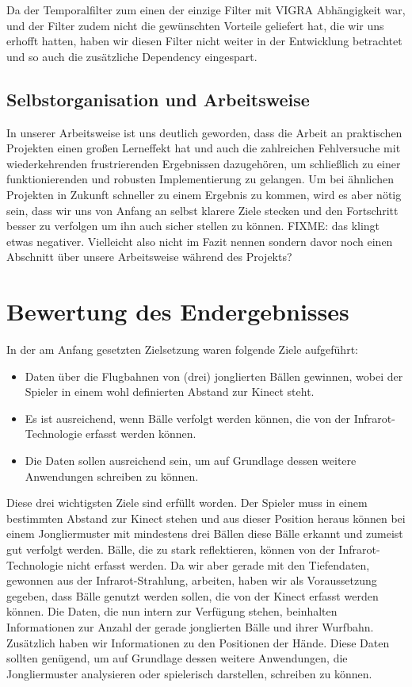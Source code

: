 \documentclass[12pt,a4paper,ngerman]{scrartcl}
\begin{document}
Da der Temporalfilter zum einen der einzige Filter mit VIGRA Abhängigkeit war, und
der Filter zudem nicht die gewünschten Vorteile geliefert hat, die wir uns erhofft
hatten, haben wir diesen Filter nicht weiter in der Entwicklung betrachtet und so
auch die zusätzliche Dependency eingespart.

\subsection{Selbstorganisation und Arbeitsweise}

In unserer Arbeitsweise ist uns deutlich geworden, dass die Arbeit an praktischen
Projekten einen großen Lerneffekt hat und auch die zahlreichen Fehlversuche mit
wiederkehrenden frustrierenden Ergebnissen dazugehören, um schließlich zu einer
funktionierenden und robusten Implementierung zu gelangen. Um bei ähnlichen
Projekten in Zukunft schneller zu einem Ergebnis zu kommen, wird es aber nötig
sein, dass wir uns von Anfang an selbst klarere Ziele stecken und den Fortschritt
besser zu verfolgen um ihn auch sicher stellen zu können.
{\color{red}FIXME: das klingt etwas negativer. Vielleicht also nicht im Fazit nennen sondern davor noch einen Abschnitt über unsere Arbeitsweise während des Projekts?}

\section{Bewertung des Endergebnisses}

In der am Anfang gesetzten Zielsetzung waren folgende Ziele aufgeführt:

\begin{itemize}
\item Daten über die Flugbahnen von (drei) jonglierten Bällen gewinnen, wobei der Spieler in einem wohl definierten Abstand zur Kinect steht.
\item Es ist ausreichend, wenn Bälle verfolgt werden können, die von der Infrarot-Technologie erfasst werden können.
\item Die Daten sollen ausreichend sein, um auf Grundlage dessen weitere Anwendungen schreiben zu können.
\end{itemize}

Diese drei wichtigsten Ziele sind erfüllt worden. Der Spieler muss in einem bestimmten Abstand zur Kinect stehen und aus dieser Position heraus können bei einem Jongliermuster mit mindestens drei Bällen diese Bälle erkannt und zumeist gut verfolgt werden. Bälle, die zu stark reflektieren, können von der Infrarot-Technologie nicht erfasst werden. Da wir aber gerade mit den Tiefendaten, gewonnen aus der Infrarot-Strahlung, arbeiten, haben wir als Voraussetzung gegeben, dass Bälle genutzt werden sollen, die von der Kinect erfasst werden können. Die Daten, die nun intern zur Verfügung stehen, beinhalten Informationen zur Anzahl der gerade jonglierten Bälle und ihrer Wurfbahn. Zusätzlich haben wir Informationen zu den Positionen der Hände. Diese Daten sollten genügend, um auf Grundlage dessen weitere Anwendungen, die Jongliermuster analysieren oder spielerisch darstellen, schreiben zu können.
\end{document}
